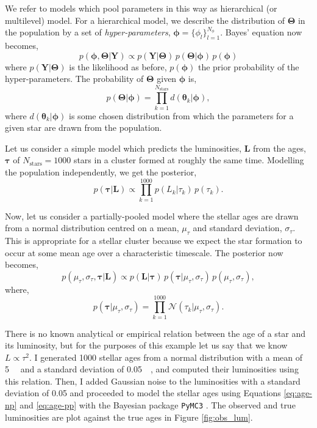 We refer to models which pool parameters in this way as hierarchical (or multilevel) model. For a hierarchical model, we describe the distribution of $\bm{\Theta}$ in the population by a set of \emph{hyper-parameters}, $\bm{\phi} = \{ \phi_l \}_{l=1}^{N_\phi}$. Bayes' equation now becomes,
%
\begin{equation}
    p(\bm{\phi}, \bm{\Theta} | \bm{Y}) \propto p(\bm{Y} | \bm{\Theta}) \, p(\bm{\Theta} | \bm{\phi}) \, p(\bm{\phi})
\end{equation}
%
where $p(\bm{Y} | \bm{\Theta})$ is the likelihood as before, $p(\bm{\phi})$ the prior probability of the hyper-parameters. The probability of $\bm{\Theta}$ given $\bm{\phi}$ is,
%
\begin{equation}
    p(\bm{\Theta} | \bm{\phi}) = \prod_{k=1}^{N_\mathrm{stars}} d(\bm{\theta}_k | \bm{\phi}),
\end{equation}
%
where $d(\bm{\theta}_k | \bm{\phi})$ is some chosen distribution from which the parameters for a given star are drawn from the population. 

Let us consider a simple model which predicts the luminosities, $\bm{L}$ from the ages, $\bm{\tau}$ of $N_\mathrm{stars} = 1000$ stars in a cluster formed at roughly the same time. Modelling the population independently, we get the posterior,
%
\begin{equation}
    p(\bm{\tau} | \bm{L}) \propto \prod_{k=1}^{1000} p(L_k | \tau_k) \, p(\tau_k).
    \label{eq:age-np}
\end{equation}
%

Now, let us consider a partially-pooled model where the stellar ages are drawn from a normal distribution centred on a mean, $\mu_\tau$ and standard deviation, $\sigma_\tau$. This is appropriate for a stellar cluster because we expect the star formation to occur at some mean age over a characteristic timescale. The posterior now becomes,
%
\begin{equation}
    p(\mu_\tau, \sigma_\tau, \bm{\tau} | \bm{L}) \propto p(\bm{L} | \bm{\tau}) \, p(\bm{\tau} | \mu_\tau, \sigma_\tau) \, p(\mu_\tau, \sigma_\tau),
    \label{eq:age-pp}
\end{equation}
%
where,
%
\begin{equation}
    p(\bm{\tau} | \mu_\tau, \sigma_\tau) = \prod_{k=1}^{1000} \mathcal{N}(\tau_k | \mu_\tau, \sigma_\tau).
\end{equation}

There is no known analytical or empirical relation between the age of a star and its luminosity, but for the purposes of this example let us say that we know $L \propto \tau^{2}$. I generated 1000 stellar ages from a normal distribution with a mean of \SI{5}{\giga\year} and a standard deviation of \SI{0.05}{\giga\year}, and computed their luminosities using this relation. Then, I added Gaussian noise to the luminosities with a standard deviation of \SI{0.05}{\solarluminosity} and proceeded to model the stellar ages using Equations \ref{eq:age-np} and \ref{eq:age-pp} with the Bayesian package \texttt{PyMC3} \citep{Salvatier.Wiecki.ea2016}. The observed and true luminosities are plot against the true ages in Figure \ref{fig:obs_lum}.

